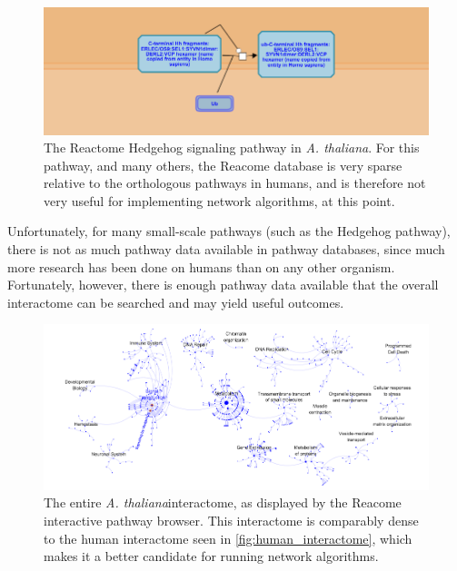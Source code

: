 \documentclass[12pt,twoside]{reedthesis}
\theoremstyle{definition}
\newcommand{\arabidopsis}{\textit{A. thaliana}}
\begin{document}
\begin{figure}[h]
  \begin{center}
    \includegraphics[width=\textwidth]{at_hh}
  \caption[\textit{Arabidopsis thaliana} Hedgehog pathway]{The Reactome Hedgehog signaling pathway in \arabidopsis. For this pathway, and many others, the Reacome database is very sparse relative to the orthologous pathways in humans, and is therefore not very useful for implementing network algorithms, at this point.}
  \label{fig:at_hh}
  \end{center}
\end{figure}

Unfortunately, for many small-scale pathways (such as the Hedgehog pathway), there is not as much pathway data available in pathway databases, since much more research has been done on humans than on any other organism. Fortunately, however, there is enough pathway data available that the overall interactome can be searched and may yield useful outcomes.\par

\begin{figure}[h]
  \begin{center}
    \includegraphics[width=\textwidth]{at_interactome}
  \caption[\textit{Arabidopsis thaliana} interactome]{The entire \arabidopsis interactome, as displayed by the Reacome interactive pathway browser. This interactome is comparably dense to the human interactome seen in \ref{fig:human_interactome}, which makes it a better candidate for running network algorithms.}
  \label{fig:at_interactome}
  \end{center}
\end{figure}
\end{document}
